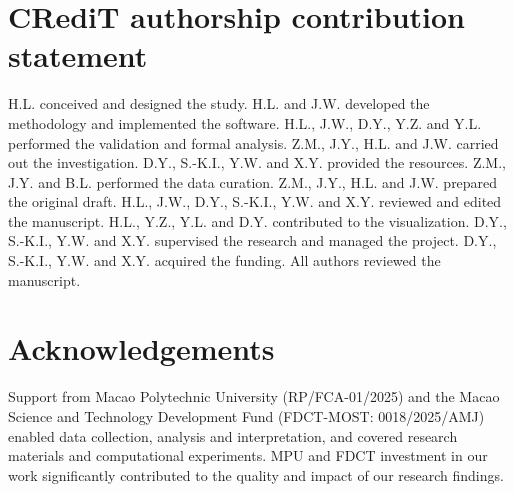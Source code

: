\documentclass[preprint,12pt]{elsarticle}
\begin{document}
\section*{CRediT authorship contribution statement}
H.L. conceived and designed the study. H.L. and J.W. developed the methodology and implemented the software. H.L., J.W., D.Y., Y.Z. and Y.L. performed the validation and formal analysis. Z.M., J.Y., H.L. and J.W. carried out the investigation. D.Y., S.-K.I., Y.W. and X.Y. provided the resources. Z.M., J.Y. and B.L. performed the data curation. Z.M., J.Y., H.L. and J.W. prepared the original draft. H.L., J.W., D.Y., S.-K.I., Y.W. and X.Y. reviewed and edited the manuscript. H.L., Y.Z., Y.L. and D.Y. contributed to the visualization. D.Y., S.-K.I., Y.W. and X.Y. supervised the research and managed the project. D.Y., S.-K.I., Y.W. and X.Y. acquired the funding. All authors reviewed the manuscript.

\section*{Acknowledgements}
\begin{sloppypar}
Support from Macao Polytechnic University (RP/FCA-01/2025) and the Macao Science and Technology Development Fund (FDCT-MOST:\allowbreak{} 0018/\allowbreak{}2025/\allowbreak{}AMJ) enabled data collection, analysis and interpretation, and covered research materials and computational experiments. MPU and FDCT investment in our work significantly contributed to the quality and impact of our research findings.
\end{sloppypar}



\end{document}
